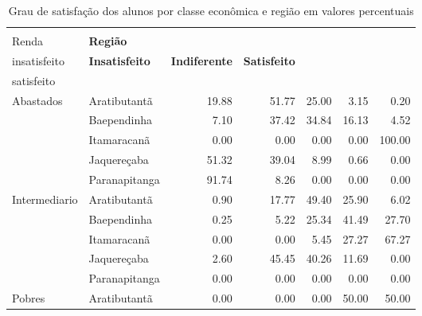 \begin{table}[h]
\scriptsize
\centering
\caption{Grau de satisfação dos alunos por classe econômica e região em valores percentuais}
\label{tabela:q16p}
\vspace{0.5em}
\begin{tabular}{ll rrrrr}
\toprule
\textbf{\specialcell{c}{Classe de \\Renda}}   & \textbf{Região}  & \textbf{\specialcell{c}{Muito\\insatisfeito}} & \textbf{Insatisfeito} & \textbf{Indiferente} & \textbf{Satisfeito} & \textbf{\specialcell{c}{Muito\\satisfeito}}\\
\midrule
Abastados     & Aratibutantã            &              19.88 &        51.77 &       25.00 &       3.15 &             0.20 \\ 
                & Baependinha             &               7.10 &        37.42 &       34.84 &      16.13 &             4.52 \\ 
                & Itamaracanã             &               0.00 &         0.00 &        0.00 &       0.00 &           100.00 \\ 
                & Jaquereçaba             &              51.32 &        39.04 &        8.99 &       0.66 &             0.00 \\ 
                & Paranapitanga           &              91.74 &         8.26 &        0.00 &       0.00 &             0.00 \\ 
\midrule
     Intermediario & Aratibutantã            &               0.90 &        17.77 &       49.40 &      25.90 &             6.02 \\ 
                & Baependinha             &               0.25 &         5.22 &       25.34 &      41.49 &            27.70 \\ 
                & Itamaracanã             &               0.00 &         0.00 &        5.45 &      27.27 &            67.27 \\ 
                & Jaquereçaba             &               2.60 &        45.45 &       40.26 &      11.69 &             0.00 \\ 
                & Paranapitanga           &               0.00 &         0.00 &        0.00 &       0.00 &             0.00 \\ 
\midrule
     Pobres        & Aratibutantã            &               0.00 &         0.00 &        0.00 &      50.00 &            50.00 \\ 

\end{tabular}
\end{table}
